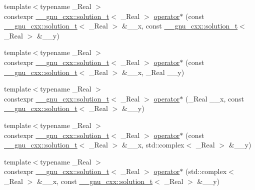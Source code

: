 \begin{DoxyCompactItemize}
\item 
{\footnotesize template$<$typename \+\_\+\+Real $>$ }\\constexpr \hyperlink{namespace____gnu__cxx_ae20ea642de50eb361074c62676b0159c}{\+\_\+\+\_\+gnu\+\_\+cxx\+::solution\+\_\+t}$<$ \+\_\+\+Real $>$ \hyperlink{namespacestd_afe761665ed44abc2edacac26cb45c645}{operator$\ast$} (const \hyperlink{namespace____gnu__cxx_ae20ea642de50eb361074c62676b0159c}{\+\_\+\+\_\+gnu\+\_\+cxx\+::solution\+\_\+t}$<$ \+\_\+\+Real $>$ \&\+\_\+\+\_\+x, const \hyperlink{namespace____gnu__cxx_ae20ea642de50eb361074c62676b0159c}{\+\_\+\+\_\+gnu\+\_\+cxx\+::solution\+\_\+t}$<$ \+\_\+\+Real $>$ \&\+\_\+\+\_\+y)
\item 
{\footnotesize template$<$typename \+\_\+\+Real $>$ }\\constexpr \hyperlink{namespace____gnu__cxx_ae20ea642de50eb361074c62676b0159c}{\+\_\+\+\_\+gnu\+\_\+cxx\+::solution\+\_\+t}$<$ \+\_\+\+Real $>$ \hyperlink{namespacestd_a13970e4b2bf6680ae3284c0f1117ea4d}{operator$\ast$} (const \hyperlink{namespace____gnu__cxx_ae20ea642de50eb361074c62676b0159c}{\+\_\+\+\_\+gnu\+\_\+cxx\+::solution\+\_\+t}$<$ \+\_\+\+Real $>$ \&\+\_\+\+\_\+x, \+\_\+\+Real \+\_\+\+\_\+y)
\item 
{\footnotesize template$<$typename \+\_\+\+Real $>$ }\\constexpr \hyperlink{namespace____gnu__cxx_ae20ea642de50eb361074c62676b0159c}{\+\_\+\+\_\+gnu\+\_\+cxx\+::solution\+\_\+t}$<$ \+\_\+\+Real $>$ \hyperlink{namespacestd_ab5d6a3adb4cf1cddc401e0465b832318}{operator$\ast$} (\+\_\+\+Real \+\_\+\+\_\+x, const \hyperlink{namespace____gnu__cxx_ae20ea642de50eb361074c62676b0159c}{\+\_\+\+\_\+gnu\+\_\+cxx\+::solution\+\_\+t}$<$ \+\_\+\+Real $>$ \&\+\_\+\+\_\+y)
\item 
{\footnotesize template$<$typename \+\_\+\+Real $>$ }\\constexpr \hyperlink{namespace____gnu__cxx_ae20ea642de50eb361074c62676b0159c}{\+\_\+\+\_\+gnu\+\_\+cxx\+::solution\+\_\+t}$<$ \+\_\+\+Real $>$ \hyperlink{namespacestd_acfa023cb6fb21c4285b73e1728cf340d}{operator$\ast$} (const \hyperlink{namespace____gnu__cxx_ae20ea642de50eb361074c62676b0159c}{\+\_\+\+\_\+gnu\+\_\+cxx\+::solution\+\_\+t}$<$ \+\_\+\+Real $>$ \&\+\_\+\+\_\+x, std\+::complex$<$ \+\_\+\+Real $>$ \&\+\_\+\+\_\+y)
\item 
{\footnotesize template$<$typename \+\_\+\+Real $>$ }\\constexpr \hyperlink{namespace____gnu__cxx_ae20ea642de50eb361074c62676b0159c}{\+\_\+\+\_\+gnu\+\_\+cxx\+::solution\+\_\+t}$<$ \+\_\+\+Real $>$ \hyperlink{namespacestd_ae82d1f9ca11a46b93a33f2f89ce71305}{operator$\ast$} (std\+::complex$<$ \+\_\+\+Real $>$ \&\+\_\+\+\_\+x, const \hyperlink{namespace____gnu__cxx_ae20ea642de50eb361074c62676b0159c}{\+\_\+\+\_\+gnu\+\_\+cxx\+::solution\+\_\+t}$<$ \+\_\+\+Real $>$ \&\+\_\+\+\_\+y)

\end{DoxyCompactItemize}
